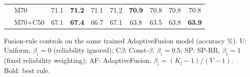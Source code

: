 \begin{table}[!t]
\begin{tabular}{llcccccccc}
 & M70 & 71.1 & \textbf{71.2} & 71.1 & 71.2 & \textbf{70.9} & 70.8 & 70.8 & 70.8 \\
 & M70+C50 & 67.1 & \textbf{67.4} & 66.7 & 67.1 & 63.8 & 63.5 & 63.8 & \textbf{63.9} \\
\bottomrule
\end{tabular}
\par\smallskip
\parbox{\linewidth}{\scriptsize Fusion-rule controls on the same trained AdaptiveFusion model (accuracy \%). U: Uniform, $\beta_i=0$ (reliability ignored); C$\beta$: Const-$\beta$, $\beta_i=0.5$; SP: SP-RR, $\beta_i=1$ (fixed reliability weighting); AF: AdaptiveFusion, $\beta_i=(K_i-1)/(V-1)$. Bold: best rule.}
\end{table}
